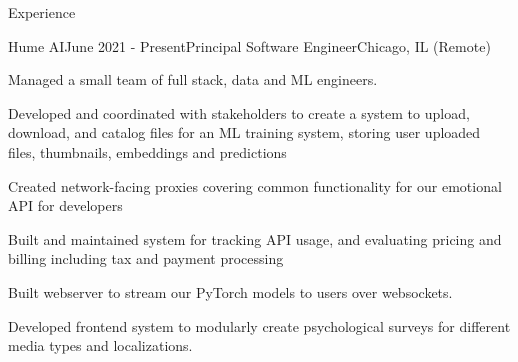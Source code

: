 \documentclass{resume} %
\begin{document}



\begin{rSection}{Experience}


\begin{rSubsection}{Hume AI}{June 2021 - Present}{Principal Software Engineer}{Chicago, IL (Remote)}
\item Managed a small team of full stack, data and ML engineers.
\item Developed and coordinated with stakeholders to create a system to upload, download, and catalog files for an ML training system, storing user uploaded files, thumbnails, embeddings and predictions
\item Created network-facing proxies covering common functionality for our emotional API for developers
\item Built and maintained system for tracking API usage, and evaluating pricing and billing including tax and payment processing
\item Built webserver to stream our PyTorch models to users over websockets.
\item Developed frontend system to modularly create psychological surveys for different media types and localizations.
\end{rSubsection}



\end{rSection}
\end{document}
